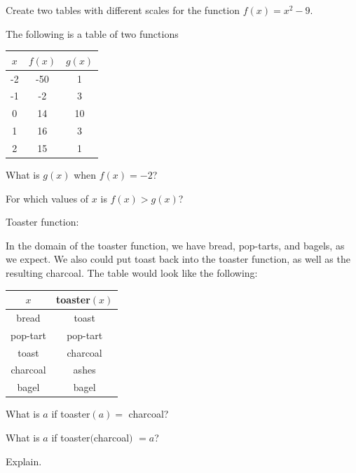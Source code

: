 \bigskip
\begin{exercise}
	Create two tables with different scales for the function $f(x) = x^2 - 9$.
\end{exercise}
\bigskip

\begin{exercise}
The following is a table of two functions

\begin{center}
\begin{tabular}{|c|c|c|}
\hline
$x$ & $f(x)$ & $g(x)$ \\
\hline
-2 & -50 & 1\\
\hline
-1 & -2 & 3\\
\hline
0 & 14 & 10\\
\hline
1 & 16 & 3\\
\hline
2 & 15 & 1\\
\hline
\end{tabular}
\end{center}

What is $g(x)$ when $f(x) = -2$?

For which values of $x$ is $f(x) > g(x)$?

\end{exercise}
\bigskip

\begin{exercise}

Toaster function:

In the domain of the toaster function, we have bread, pop-tarts, and bagels, as we expect.  We also could put toast back into the toaster function, as well as the resulting charcoal.  The table would look like the following:

\begin{center}
\begin{tabular}{|c|c|}
\hline
$x$ & toaster$(x)$\\
\hline
bread & toast\\
\hline
pop-tart & pop-tart\\
\hline
toast & charcoal\\
\hline
charcoal & ashes\\
\hline
bagel & bagel\\
\hline
\end{tabular}
\end{center}

What is $a$ if toaster$(a) = $ charcoal?

What is $a$ if toaster$($charcoal$)$ $ = a$?

Explain.

\end{exercise}
\bigskip

